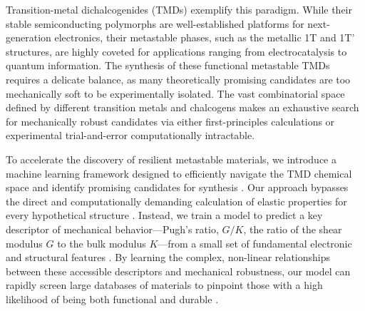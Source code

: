 \documentclass[]{article}
\begin{document}
Transition-metal dichalcogenides (TMDs) exemplify this paradigm. While their stable semiconducting polymorphs are well-established platforms for next-generation electronics, their metastable phases, such as the metallic 1T and 1T' structures, are highly coveted for applications ranging from electrocatalysis to quantum information.\citep{Kretschmer_2017,yin2024unraveling,Wang_2020,Lee_2020,Yin_2021,Demirkol_2022,Li_2026} The synthesis of these functional metastable TMDs requires a delicate balance, as many theoretically promising candidates are too mechanically soft to be experimentally isolated.\citep{yin2024unraveling,Demirkol_2022,Li_2026} The vast combinatorial space defined by different transition metals and chalcogens makes an exhaustive search for mechanically robust candidates via either first-principles calculations or experimental trial-and-error computationally intractable.\citep{hemmat2020quasibinary,Liu_2024,jaidka2026structurepropertyapplication}

To accelerate the discovery of resilient metastable materials, we introduce a machine learning framework designed to efficiently navigate the TMD chemical space and identify promising candidates for synthesis \citep{dejong2018statistical,Yuan_2025,Griesemer_2023,chen2021leveraginglargescalecomputationaldatabase,Tawfik_2022,Deng_2023,xin2025bridgingtheoryexperimentmaterials}. Our approach bypasses the direct and computationally demanding calculation of elastic properties for every hypothetical structure \citep{Yuan_2025,Jin_2023,Griesemer_2023}. Instead, we train a model to predict a key descriptor of mechanical behavior—Pugh's ratio, $G/K$, the ratio of the shear modulus $G$ to the bulk modulus $K$—from a small set of fundamental electronic and structural features \citep{dejong2018statistical,Jin_2023,stracke2025evaluatingmechanicalpropertyprediction,yue2023highthroughput}. By learning the complex, non-linear relationships between these accessible descriptors and mechanical robustness, our model can rapidly screen large databases of materials to pinpoint those with a high likelihood of being both functional and durable \citep{Deng_2023,Jin_2023,yue2023highthroughput,Griesemer_2023,chen2021leveraginglargescalecomputationaldatabase,dejong2018statistical}.
\end{document}
